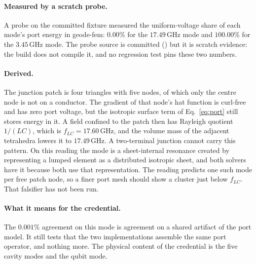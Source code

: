 \documentclass{anvil-paper}
\begin{document}
\paragraph{Measured by a scratch probe.}
A probe on the committed fixture measured the uniform-voltage share of
each mode's port energy in geode-fem: $0.00\%$ for the $17.49$\,GHz mode
and $100.00\%$ for the $3.45$\,GHz mode. The probe source is committed
()
but it is scratch evidence: the build does not compile it, and no
regression test pins these two numbers.

\paragraph{Derived.}
The junction patch is four triangles with five nodes, of which only the
centre node is not on a conductor. The gradient of that node's hat
function is curl-free and has zero port voltage, but the isotropic
surface term of Eq.~\ref{eq:port} still stores energy in it. A field
confined to the patch then has Rayleigh quotient $1/(LC)$, which is
$f_{LC} = 17.60$\,GHz, and the volume mass of the adjacent tetrahedra
lowers it to $17.49$\,GHz. A two-terminal junction cannot carry this
pattern. On this reading the mode is a sheet-internal resonance created
by representing a lumped element as a distributed isotropic sheet, and
both solvers have it because both use that representation. The reading
predicts one such mode per free patch node, so a finer port mesh should
show a cluster just below $f_{LC}$. That falsifier has not been run.

\paragraph{What it means for the credential.}
The $0.001\%$ agreement on this mode is agreement on a shared artifact
of the port model. It still tests that the two implementations assemble
the same port operator, and nothing more. The physical content of the
credential is the five cavity modes and the qubit mode.
\end{document}
